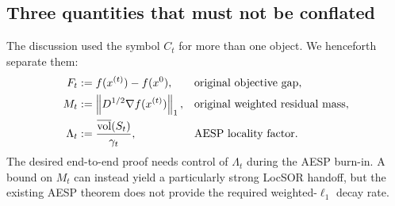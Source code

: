 \subsection{Three quantities that must not be conflated}

The discussion used the symbol \(C_t\) for more than one object.  We henceforth
separate them:
\begin{align}
    F_t
    &:=f(x^{(t)})-f(x^0),
    &&\text{original objective gap},
    \label{eq:objective-gap-def}\\
    M_t
    &:=\left\lVert D^{1/2}\nabla f(x^{(t)})\right\rVert_1,
    &&\text{original weighted residual mass},
    \label{eq:mass-def}\\
    \Lambda_t
    &:=\frac{\overline{\operatorname{vol}}(S_t)}{\gamma_t},
    &&\text{AESP locality factor}.
    \label{eq:locality-factor-def}
\end{align}
The desired end-to-end proof needs control of \(\Lambda_t\) during the AESP
burn-in.  A bound on \(M_t\) can instead yield a particularly strong LocSOR
handoff, but the existing AESP theorem does not provide the required
weighted-\(\ell_1\) decay rate.
